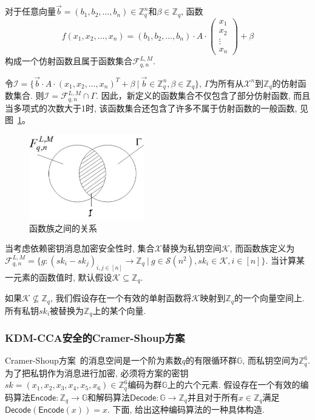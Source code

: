 对于任意向量$\vec{b} = (b_1, b_2, \ldots, b_n) \in \mathbb{Z}_q^n$和$\beta \in \mathbb{Z}_q$, 函数
\[
f(x_1, x_2, \ldots, x_n) = (b_1, b_2, \ldots, b_n) \cdot A \cdot
                \left(\begin{array}{c}
                  x_1      \\
                  x_2      \\
                  \vdots   \\
                  x_n
                \end{array}\right) + \beta
\] 
构成一个仿射函数且属于函数集合$\mathcal{F}_{q, n}^{L, M}$.

令$\mathcal{I} = \{\vec{b} \cdot A \cdot  (x_1, x_2, \ldots, x_n)^T + \beta ~|~\vec{b} \in \mathbb{Z}_q^n, \beta \in \mathbb{Z}_q\}$, $\Gamma$为所有从$\mathcal{X}^n$到$\mathbb{Z}_q$的仿射函数集合. 则$\mathcal{I} = \mathcal{F}_{q, n}^{L,M} \cap  \Gamma$. 因此，新定义的函数集合不仅包含了部分仿射函数, 而且当多项式的次数大于1时, 该函数集合还包含了许多不属于仿射函数的一般函数, 见图~\ref{fig:ch5-1}。
\begin{figure}[h]
\centering
\includegraphics[width=50mm]{figure/KDM-Fun.pdf}
\caption{函数族之间的关系} \label{fig:ch5-1}
\end{figure}

当考虑依赖密钥消息加密安全性时, 集合$\mathcal{X}$替换为私钥空间$\mathcal{K}$, 而函数族定义为
 $\mathcal{F}_{q, n}^{L, M} = \{g: (sk_i - sk_j)_{i, j \in [n]} \rightarrow \mathbb{Z}_q ~|~  g \in \mathcal{S}(n^2), sk_i\in \mathcal{K}, i\in [n]\}$. 当计算某一元素的函数值时, 默认假设$\mathcal{K} \subseteq \mathbb{Z}_q$.

如果$\mathcal{K} \nsubseteq \mathbb{Z}_q$, 我们假设存在一个有效的单射函数将$\mathcal{K}$映射到$\mathbb{Z}_q$的一个向量空间上. 所有私钥$sk_i$被替换为$\mathbb{Z}_q$上的某个向量.

\subsubsection{KDM-CCA安全的Cramer-Shoup方案}\label{sec:ch5-KDMCS}
Cramer-Shoup方案~\cite{CramerS03}的消息空间是一个阶为素数$q$的有限循环群$\mathbb{G}$, 而私钥空间为$\mathbb{Z}_q^6$. 为了把私钥作为消息进行加密, 必须将方案的密钥$sk = (x_1, x_2, x_3, x_4, x_5, x_6) \in \mathbb{Z}_q^6$编码为群$\mathbb{G}$上的六个元素. 假设存在一个有效的编码算法$\mathsf{Encode}: \mathbb{Z}_q \rightarrow \mathbb{G}$和解码算法$\mathsf{Decode}:  \mathbb{G} \rightarrow \mathbb{Z}_q$并且对于所有$x\in \mathbb{Z}_q$满足$\mathsf{Decode}(\mathsf{Encode}(x)) = x$. 下面, 给出这种编码算法的一种具体构造.


